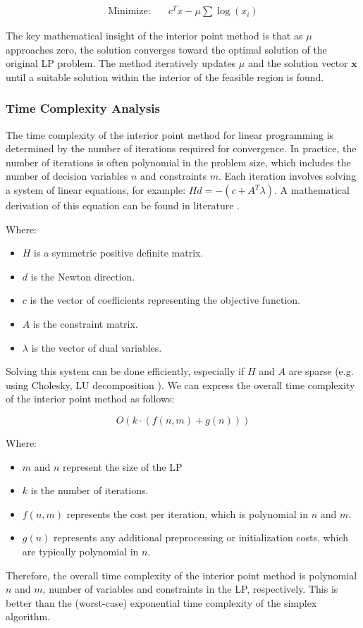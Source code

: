 \[
    \begin{aligned}
        \text{Minimize:} \quad & c^Tx - \mu \sum \log(x_i)
    \end{aligned}
\]

The key mathematical insight of the interior point method is that as $\mu$ approaches zero, the solution converges toward the optimal solution of the original LP problem. The method iteratively updates $\mu$ and the solution vector $\mathbf{x}$ until a suitable solution within the interior
of the feasible region is found.

\subsubsection{Time Complexity Analysis}
The time complexity of the interior point method for linear programming is determined by the number of iterations required for convergence. In practice, the number of iterations is often polynomial in
the problem size, which includes the number of decision variables $n$ and constraints $m$.
Each iteration involves solving a system of linear equations, for example: $Hd = -(c + A^T\lambda)$. A mathematical derivation of this equation can be found in literature \parencite{alizadeh1995interior}.

Where:
\begin{itemize}
    \item $H$ is a symmetric positive definite matrix.
    \item $d$ is the Newton direction.
    \item $c$ is the vector of coefficients representing the objective function.
    \item $A$ is the constraint matrix.
    \item $\lambda$ is the vector of dual variables.
\end{itemize}


Solving this system can be done efficiently, especially if $H$ and $A$ are sparse (e.g. using Cholesky, LU decomposition \parencite{golub2013matrix}).
We can express the overall time complexity of the interior point method as follows:

\[
    O(k \cdot (f(n, m) + g(n)))
\]

Where:
\begin{itemize}
    \item $m$ and $n$ represent the size of the LP
    \item $k$ is the number of iterations.
    \item $f(n, m)$ represents the cost per iteration, which is polynomial in $n$ and $m$.
    \item $g(n)$ represents any additional preprocessing or initialization costs, which are typically polynomial in $n$.
\end{itemize}
Therefore, the overall time complexity of the interior point method is polynomial $n$ and $m$, number of variables and constraints in the LP, respectively. This is better than the (worst-case) exponential time complexity of the simplex algorithm.

